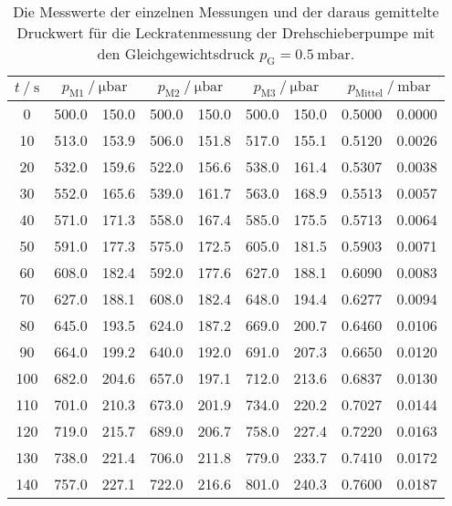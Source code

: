   \begin{table}[h]
    \centering
    \caption{Die Messwerte der einzelnen Messungen und der daraus gemittelte Druckwert für die Leckratenmessung der Drehschieberpumpe mit den 
    Gleichgewichtsdruck $p_\text{G} = \SI{0.5}{\milli\bar}$.}
    \label{tab:dreh_leck_05}
    \begin{tabular}{S[table-format=3.0] S @{${}\pm{}$} S S @{${}\pm{}$} S S @{${}\pm{}$} S S[table-format=1.4] @{${}\pm{}$} S[table-format=1.4]}
    \toprule
    {$t \mathbin{/} \si{\second} $} &  &  &  &  \\
     &  500.0 & 150.0 & 500.0 & 150.0 & 500.0 & 150.0 & 0.5000 & 0.0000 \\  
     10 &  513.0 & 153.9 & 506.0 & 151.8 & 517.0 & 155.1 & 0.5120 & 0.0026 \\
     20 &  532.0 & 159.6 & 522.0 & 156.6 & 538.0 & 161.4 & 0.5307 & 0.0038 \\
     30 &  552.0 & 165.6 & 539.0 & 161.7 & 563.0 & 168.9 & 0.5513 & 0.0057 \\
     40 &  571.0 & 171.3 & 558.0 & 167.4 & 585.0 & 175.5 & 0.5713 & 0.0064 \\
     50 &  591.0 & 177.3 & 575.0 & 172.5 & 605.0 & 181.5 & 0.5903 & 0.0071 \\
     60 &  608.0 & 182.4 & 592.0 & 177.6 & 627.0 & 188.1 & 0.6090 & 0.0083 \\
     70 &  627.0 & 188.1 & 608.0 & 182.4 & 648.0 & 194.4 & 0.6277 & 0.0094 \\
     80 &  645.0 & 193.5 & 624.0 & 187.2 & 669.0 & 200.7 & 0.6460 & 0.0106 \\
     90 &  664.0 & 199.2 & 640.0 & 192.0 & 691.0 & 207.3 & 0.6650 & 0.0120 \\
    100 &  682.0 & 204.6 & 657.0 & 197.1 & 712.0 & 213.6 & 0.6837 & 0.0130 \\
    110 &  701.0 & 210.3 & 673.0 & 201.9 & 734.0 & 220.2 & 0.7027 & 0.0144 \\
    120 &  719.0 & 215.7 & 689.0 & 206.7 & 758.0 & 227.4 & 0.7220 & 0.0163 \\
    130 &  738.0 & 221.4 & 706.0 & 211.8 & 779.0 & 233.7 & 0.7410 & 0.0172 \\
    140 &  757.0 & 227.1 & 722.0 & 216.6 & 801.0 & 240.3 & 0.7600 & 0.0187 \\

\end{tabular}
\end{table}
